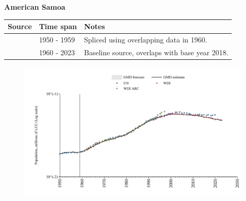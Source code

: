 \documentclass[12pt,a4paper,landscape]{article}
\begin{document}
\begin{adjustbox}{max totalsize={\paperwidth}{\paperheight},center}
\begin{minipage}[t][\textheight][t]{\textwidth}
\vspace*{0.5cm}
{}
\begin{center}
{\Large\bfseries American Samoa}
\end{center}
\vspace{0.5cm}
\begin{table}[H]
\centering
\small
\begin{tabular}{|l|l|l|}
\hline
\textbf{Source} & \textbf{Time span} & \textbf{Notes} \\
\hline
\rowcolor{white}\cite{UN}& 1950 - 1959 &Spliced using overlapping data in 1960.\\
\rowcolor{lightgray}\cite{WDI}& 1960 - 2023 &Baseline source, overlaps with base year 2018.\\
\hline
\end{tabular}
\end{table}
\begin{figure}[H]
\centering
\includegraphics[width=\textwidth,height=0.6\textheight,keepaspectratio]{graphs/ASM_pop.pdf}
\end{figure}
\end{minipage}
\end{adjustbox}
\end{document}
